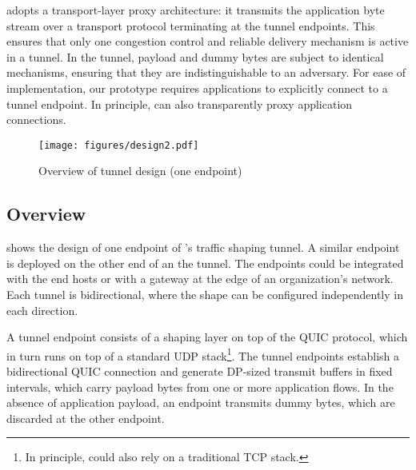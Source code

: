 {\sys} adopts a transport-layer proxy architecture: it transmits
the application byte stream over a transport protocol terminating at the
tunnel endpoints.
This ensures that only one congestion control and reliable delivery mechanism is
active in a tunnel.
In the tunnel, payload and dummy bytes are subject to identical
mechanisms, ensuring that they are indistinguishable to an adversary.
For ease of implementation, our prototype requires applications to explicitly
connect to a tunnel endpoint.
In principle, {\sys} can also transparently proxy application
connections.

\begin{figure}[t]
    \centering
    \texttt{[image: figures/design2.pdf]}
    \caption{Overview of tunnel design (one endpoint)
    }
    \label{fig:minesvpn-overview}
\end{figure}

\subsection{Overview}
\label{subsec:design-overview}

 shows the design of one endpoint of {\sys}’s
traffic shaping tunnel. A similar endpoint is deployed on the other end of an the tunnel.
The endpoints could be integrated with the end hosts or with a gateway at the
edge of an organization’s network. Each tunnel is bidirectional, where the
shape can be configured independently in each direction.

A tunnel endpoint consists of a shaping layer on top of the QUIC protocol,
which in turn runs on top of a standard UDP stack\footnote{In principle, {\sys}
could also rely on a traditional TCP stack.}. The tunnel endpoints establish a
bidirectional QUIC
connection and generate DP-sized transmit buffers in fixed intervals, which
carry payload bytes from one or more application flows.
In the absence of application payload, an endpoint transmits dummy bytes, which are
discarded at the other endpoint.


